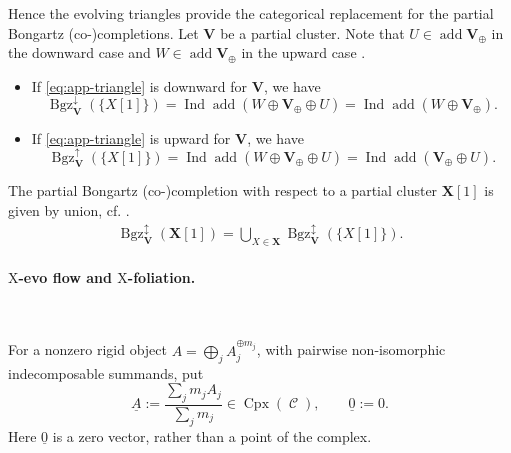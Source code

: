 \documentclass[11pt,reqno]{amsart}
\theoremstyle{plain}
\theoremstyle{definition}
\numberwithin{equation}{section}
\newcommand\hua{\mathcal}
\newcommand\<{\langle}
\renewcommand\>{\rangle}
\newcommand\Add{\operatorname{add}}
\newcommand\Ind{\operatorname{Ind}}
\newcommand{\C}{\operatorname{\hua{C}}} %
\newcommand{\on}[1]{\operatorname{#1}}
\def\CCx{\on{Cpx}}   %
\def\sink{X}
\newcommand{\pcts}[1]{\mathbf{#1}}%
\newcommand{\pcto}[1]{\mathbf{#1}_\oplus} %
\newcommand{\ccpt}[1]{\mathrm{#1}}%
\newcommand{\real}[1]{\underline{#1}}%
\def\xevo{\ccpt{X}}%
\newcommand{\Bgzp}[2]{\operatorname{Bgz}^{\uparrow}_{#2}(#1)}
\newcommand{\Bgzm}[2]{\operatorname{Bgz}^{\downarrow}_{#2}(#1)}
\newcommand{\Bgzpm}[2]{\operatorname{Bgz}^{\updownarrow}_{#2}(#1)}
\begin{document}
Hence the evolving triangles provide the categorical replacement for the partial Bongartz (co-)completions.
Let $\pcts{V}$ be a partial cluster.
Note that $U\in\Add\pcto{V}$ in the downward
case and $W\in\Add\pcto{V}$ in the upward case \cite[Rem.~3.6]{QT}.
\begin{itemize}
    \item If \eqref{eq:app-triangle} is downward for $\pcts{V}$, we have
    \begin{equation}\label{eq:app-bongartz-down}
        \Bgzm{\{X[1]\}}{\pcts{V}}
        =\Ind\Add(W\oplus\pcto{V}\oplus U)
        =\Ind\Add(W\oplus\pcto{V}).
    \end{equation}
    \item If \eqref{eq:app-triangle} is upward for $\pcts{V}$, we have
    \begin{equation}\label{eq:app-bongartz-up}
        \Bgzp{\{X[1]\}}{\pcts{V}}
        =\Ind\Add(W\oplus\pcto{V}\oplus U)
        =\Ind\Add(\pcto{V}\oplus U).
    \end{equation}
\end{itemize}
The partial Bongartz (co-)completion with respect to a partial cluster $\pcts{X}[1]$ is given by union, cf. .
\begin{gather}
    \Bgzpm{\pcts{X}[1]}{\pcts{V}}=\bigcup_{X\in\pcts{X}}\Bgzpm{\{X[1]\}}{\pcts{V}}.
\end{gather}

\paragraph{\textbf{$\xevo$-evo flow and $\xevo$-foliation.}}\

For a nonzero rigid object $A=\bigoplus_j A_j^{\oplus m_j}$, with
pairwise non-isomorphic indecomposable summands, put
\[
    \real{A}:=\frac{\sum_j m_j A_j}{\sum_j m_j}\in\CCx(\C),
    \qquad \real{0}:=0.
\]
Here $\real{0}$ is a zero vector, rather than a point of the complex.
\end{document}
